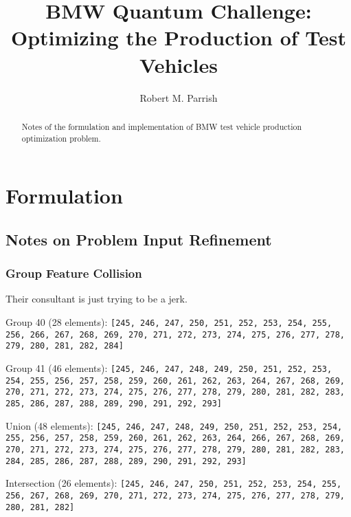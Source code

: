 \documentclass[aps,prl,twocolumn,superscriptaddress,groupedaddress]{revtex4}  %
\begin{document}

\title{
BMW Quantum Challenge: Optimizing the Production of Test Vehicles
}

\author{Robert M. Parrish}


\begin{abstract} 
Notes of the formulation and implementation of BMW test vehicle production
optimization problem.
\end{abstract}

\maketitle

\section{Formulation}


\subsection{Notes on Problem Input Refinement}

\subsubsection{Group Feature Collision}

Their consultant is just trying to be a jerk.

Group 40 (28 elements): \texttt{[245, 246, 247, 250, 251, 252, 253, 254, 255,
256, 266, 267, 268, 269, 270, 271, 272, 273, 274, 275, 276, 277, 278, 279, 280,
281, 282, 284]}

Group 41 (46 elements): \texttt{[245, 246, 247, 248, 249, 250, 251, 252, 253,
254, 255, 256, 257, 258, 259, 260, 261, 262, 263, 264, 267, 268, 269, 270, 271,
272, 273, 274, 275, 276, 277, 278, 279, 280, 281, 282, 283, 285, 286, 287, 288,
289, 290, 291, 292, 293]}

Union (48 elements): \texttt{[245, 246, 247, 248, 249, 250, 251, 252, 253, 254,
255, 256, 257, 258, 259, 260, 261, 262, 263, 264, 266, 267, 268, 269, 270, 271,
272, 273, 274, 275, 276, 277, 278, 279, 280, 281, 282, 283, 284, 285, 286, 287,
288, 289, 290, 291, 292, 293]}

Intersection (26 elements): \texttt{[245, 246, 247, 250, 251, 252, 253, 254,
255, 256, 267, 268, 269, 270, 271, 272, 273, 274, 275, 276, 277, 278, 279, 280,
281, 282]}
\end{document}
